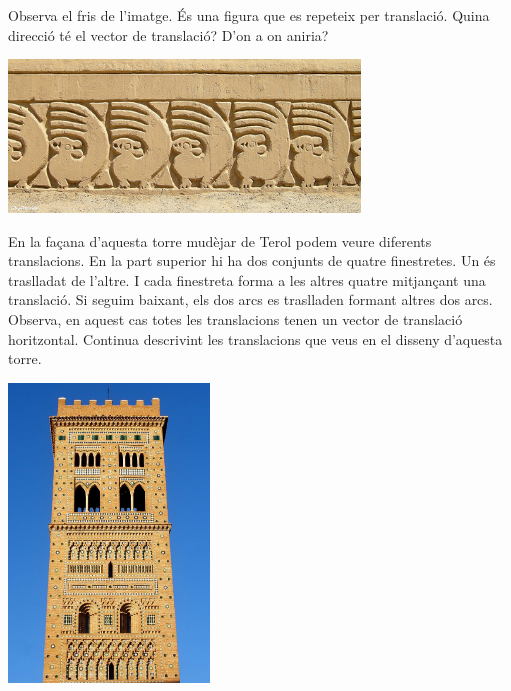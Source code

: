 \begin{mylist}
	
	\vspace{-1.5cm}
	\exer \begin{minipage}[t]{0.5\textwidth}
		Observa el fris de l'imatge. És una figura que es repeteix per translació. Quina direcció té el vector de translació? D'on a on aniria?
	\end{minipage}
	\begin{minipage}{0.5\textwidth}
		\centering
		\vspace{1.5cm}
		\includegraphics[width=0.7\textwidth]{img-10/fris}
	\end{minipage}
	
	\vspace{-4.5cm}
	\exer \begin{minipage}[t]{0.55\textwidth}
		En la façana d'aquesta torre mudèjar de Terol podem veure diferents translacions. En la part superior hi ha dos conjunts de quatre finestretes. Un és traslladat de l'altre. I cada finestreta forma a les altres quatre mitjançant una translació. Si seguim baixant, els dos arcs es traslladen formant altres dos arcs. Observa, en aquest cas totes les translacions tenen un vector de translació horitzontal. Continua descrivint les translacions que veus en el disseny d'aquesta torre.
	\end{minipage}
	\begin{minipage}{0.45\textwidth}
		\centering
		\vspace{4.5cm}
		\includegraphics[width=0.4\textwidth]{img-10/mudejar}
	\end{minipage}


\end{mylist}
